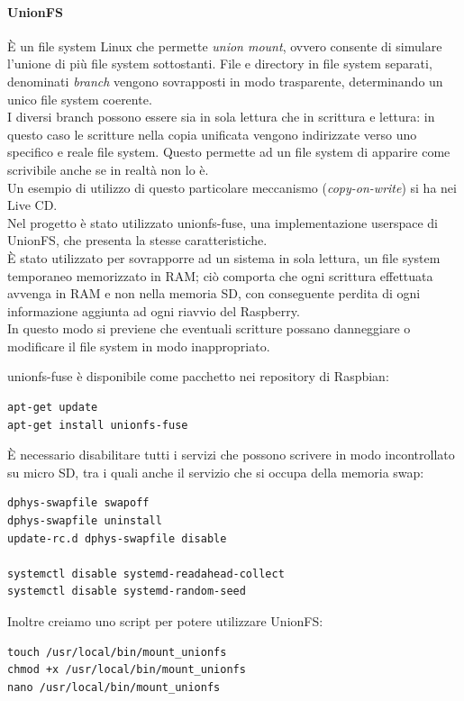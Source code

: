 \paragraph*{UnionFS}
È un file system Linux che permette \textit{union mount}, ovvero consente di simulare l'unione di più file system sottostanti. File e directory in file system separati, denominati \textit{branch} vengono sovrapposti in modo trasparente, determinando un unico file system coerente.\\
I diversi branch possono essere sia in sola lettura che in scrittura e lettura: in questo caso le scritture nella copia unificata vengono indirizzate verso uno specifico e reale file system. Questo permette ad un file system di apparire come scrivibile anche se in realtà non lo è. \\
Un esempio di utilizzo di questo particolare meccanismo (\textit{copy-on-write}) si ha nei Live CD. \\
Nel progetto è stato utilizzato unionfs-fuse, una implementazione userspace di UnionFS, che presenta la stesse caratteristiche.\\
È stato utilizzato per sovrapporre ad un sistema in sola lettura, un file system temporaneo memorizzato in RAM; ciò comporta che ogni scrittura effettuata avvenga in RAM e non nella memoria SD, con conseguente perdita di ogni informazione aggiunta ad ogni riavvio del Raspberry.\\ In questo modo si previene che eventuali scritture possano danneggiare o modificare il file system in modo inappropriato.

\noindent unionfs-fuse è disponibile come pacchetto nei repository di Raspbian:
\begin{lstlisting}
apt-get update
apt-get install unionfs-fuse
\end{lstlisting}

\noindent È necessario disabilitare tutti i servizi che possono scrivere in modo
incontrollato su micro SD, tra i quali anche il servizio che si occupa della memoria swap:
\begin{lstlisting}
dphys-swapfile swapoff
dphys-swapfile uninstall
update-rc.d dphys-swapfile disable

systemctl disable systemd-readahead-collect
systemctl disable systemd-random-seed

\end{lstlisting}

\noindent Inoltre creiamo uno script per potere utilizzare UnionFS:
\begin{lstlisting}
touch /usr/local/bin/mount_unionfs
chmod +x /usr/local/bin/mount_unionfs
nano /usr/local/bin/mount_unionfs

\end{lstlisting}

